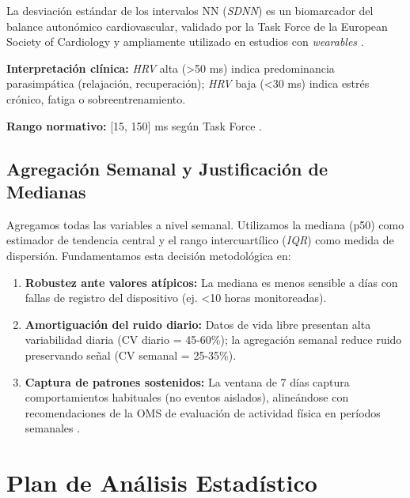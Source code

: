 La desviación estándar de los intervalos NN (\textit{SDNN}) es un biomarcador del balance autonómico cardiovascular, validado por la Task Force de la European Society of Cardiology \cite{TaskForce1996} y ampliamente utilizado en estudios con \textit{wearables} \cite{Laborde2017}.

\textbf{Interpretación clínica:} \textit{HRV} alta (>50 ms) indica predominancia parasimpática (relajación, recuperación); \textit{HRV} baja (<30 ms) indica estrés crónico, fatiga o sobreentrenamiento.

\textbf{Rango normativo:} [15, 150] ms según Task Force \cite{TaskForce1996}.

\subsection{Agregación Semanal y Justificación de Medianas}
\label{subsec:agregacion_semanal}

Agregamos todas las variables a nivel semanal. Utilizamos la mediana (p50) como estimador de tendencia central y el rango intercuartílico (\textit{IQR}) como medida de dispersión. Fundamentamos esta decisión metodológica en:

\begin{enumerate}
    \item \textbf{Robustez ante valores atípicos:} La mediana es menos sensible a días con fallas de registro del dispositivo (ej. <10 horas monitoreadas).
    
    \item \textbf{Amortiguación del ruido diario:} Datos de vida libre presentan alta variabilidad diaria (CV diario = 45-60\%); la agregación semanal reduce ruido preservando señal (CV semanal = 25-35\%).
    
    \item \textbf{Captura de patrones sostenidos:} La ventana de 7 días captura comportamientos habituales (no eventos aislados), alineándose con recomendaciones de la OMS de evaluación de actividad física en períodos semanales \cite{WHO2020}.
\end{enumerate}

\section{Plan de Análisis Estadístico}
\label{sec:plan_analisis_estadistico}

